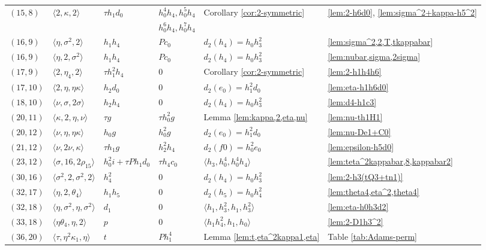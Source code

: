 \begin{landscape}
\begin{longtable}{llllll}
$(15, 8)$ & $\langle 2, \kappa, 2 \rangle$ & $\tau h_1 d_0$ & $h_0^4 h_4, h_0^5 h_4$ & Corollary \ref{cor:2-symmetric} & \ref{lem:2-h6d0}, \ref{lem:sigma^2+kappa-h5^2} \\
& & & $h_0^6 h_4, h_0^7 h_4$ \\
$(16, 9)$ & $\langle \eta, \sigma^2, 2 \rangle$ & $h_1 h_4$ & $P c_0$ & $d_2(h_4) = h_0 h_3^2$ & \ref{lem:sigma^2,2,T,tkappabar} \\
$(16, 9)$ & $\langle \eta, 2, \sigma^2 \rangle$ & $h_1 h_4$ & $P c_0$ &
$d_2(h_4) = h_0 h_3^2$ & \ref{lem:nubar,sigma,2sigma} \\
$(17, 9)$ & $\langle 2, \eta_4, 2 \rangle$ & $\tau h_1^2 h_4$ & $0$ & Corollary \ref{cor:2-symmetric} & \ref{lem:2-h1h4h6} \\
$(17, 10)$ & $\langle 2, \eta, \eta \kappa \rangle$ & $h_2 d_0$ & $0$ & $d_2(e_0) = h_1^2 d_0$ & \ref{lem:eta-h1h6d0} \\
$(18, 10)$ & $\langle \nu, \sigma, 2 \sigma \rangle$ & $h_2 h_4$ & $0$ & $d_2(h_4) = h_0 h_3^2$ & \ref{lem:d4-h1c3} \\
$(20, 11)$ & $\langle \kappa, 2, \eta, \nu \rangle$ & $\tau g$ & $\tau h_0^2 g$ & Lemma \ref{lem:kappa,2,eta,nu} & \ref{lem:nu-th1H1} \\
$(20, 12)$ & $\langle \nu, \eta, \eta \kappa \rangle$ & $h_0 g$ & $h_0^2 g$ & $d_2(e_0) = h_1^2 d_0$ & \ref{lem:nu-De1+C0} \\
$(21, 12)$ & $\langle \nu, 2 \nu, \kappa \rangle$ & $\tau h_1 g$ & $h_2^2 h_4$ & $d_2(f0) = h_0^2 e_0$ & \ref{lem:epsilon-h5d0} \\
$(23, 12)$ & $\langle \sigma, 16, 2 \rho_{15} \rangle$ & $h_0^2 i + \tau P h_1 d_0$ & $\tau h_4 c_0$ & $\langle h_3, h_0^4, h_0^4 h_4 \rangle$ & \ref{lem:teta^2kappabar,8,kappabar2} \\
$(30, 16)$ & $\langle \sigma^2, 2, \sigma^2, 2 \rangle$ & $h_4^2$ & $0$ & $d_2(h_4) = h_0 h_3^2$ & \ref{lem:2-h3(tQ3+tn1)} \\
$(32, 17)$ & $\langle \eta, 2, \theta_4 \rangle$ & $h_1 h_5$ & $0$ & $d_2(h_5) = h_0 h_4^2$ & \ref{lem:theta4,eta^2,theta4} \\
$(32, 18)$ & $\langle \eta, \sigma^2, \eta, \sigma^2 \rangle$ & $d_1$ & $0$ & $\langle h_1, h_3^2, h_1, h_3^2 \rangle$ & \ref{lem:eta-h0h3d2} \\
$(33, 18)$ & $\langle \eta \theta_4, \eta, 2 \rangle$ & $p$ & $0$ & $\langle h_1 h_4^2, h_1, h_0 \rangle$ & \ref{lem:2-D1h3^2} \\
$(36, 20)$ & $\langle \tau, \eta^2 \kappa_1, \eta \rangle$ & $t$ & $P h_1^4$ & Lemma \ref{lem:t,eta^2kappa1,eta} & Table \ref{tab:Adams-perm} \\

\end{longtable}
\end{landscape}
